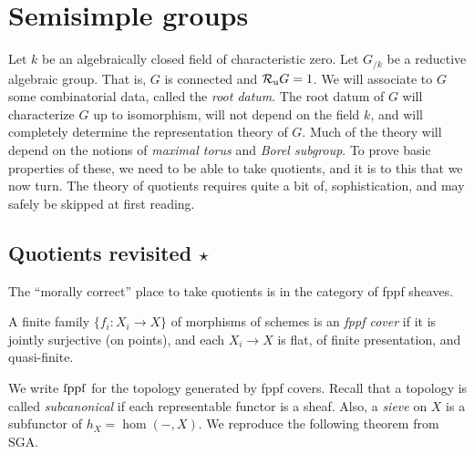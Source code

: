 








\section{Semisimple groups}

Let $k$ be an algebraically closed field of characteristic zero. Let 
$G_{/k}$ be a reductive algebraic group. That is, $G$ is connected and 
$\mathcal{R}_\mathrm{u} G=1$. We will associate to $G$ some combinatorial data, called the 
\emph{root datum}. The root datum of $G$ will characterize $G$ up to 
isomorphism, will not depend on the field $k$, and will completely determine 
the representation theory of $G$. Much of the theory will depend on the 
notions of \emph{maximal torus} and \emph{Borel subgroup}. To prove basic 
properties of these, we need to be able to take quotients, and it is to this 
that we now turn. The theory of quotients requires quite a bit of, 
sophistication, and may safely be skipped at first reading. 





\subsection{Quotients revisited \texorpdfstring{$\star$}{*}}

The ``morally correct'' place to take quotients is in the category of 
fppf sheaves. 

\begin{definition}
A finite family $\{f_i:X_i\to X\}$ of morphisms of schemes is an 
\emph{fppf cover} if it is jointly surjective (on points), and each 
$X_i\to X$ is flat, of finite presentation, and quasi-finite. 
\end{definition}

We write $\mathrm{fppf}$ for the topology generated by fppf covers. Recall that a 
topology is called \emph{subcanonical} if each representable functor is a 
sheaf. Also, a \emph{sieve} on $X$ is a subfunctor of $h_X=\hom(-,X)$. 
We reproduce the following theorem from SGA. 

